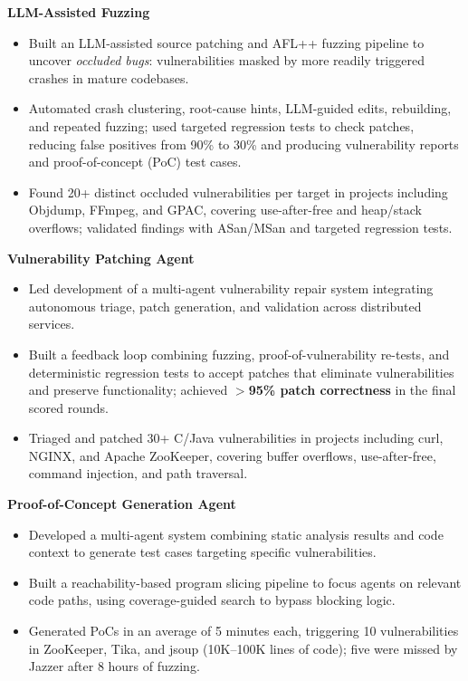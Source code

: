 \documentclass{resume}
\newcommand{\project}[1]{\par\addvspace{0.7ex}\Needspace{4\baselineskip}\textbf{#1}\par}
\begin{document}
\newpage
{}
\project{LLM-Assisted Fuzzing}
\begin{itemize}
\item Built an LLM-assisted source patching and AFL++ fuzzing pipeline to uncover \emph{occluded bugs}: vulnerabilities masked by more readily triggered crashes in mature codebases.
\item Automated crash clustering, root-cause hints, LLM-guided edits, rebuilding, and repeated fuzzing; used targeted regression tests to check patches, reducing false positives from 90\% to 30\% and producing vulnerability reports and proof-of-concept (PoC) test cases.
\item Found 20+ distinct occluded vulnerabilities per target in projects including Objdump, FFmpeg, and GPAC, covering use-after-free and heap/stack overflows; validated findings with ASan/MSan and targeted regression tests.
\end{itemize}

\project{Vulnerability Patching Agent}
\begin{itemize}
\item Led development of a multi-agent vulnerability repair system integrating autonomous triage, patch generation, and validation across distributed services.
\item Built a feedback loop combining fuzzing, proof-of-vulnerability re-tests, and deterministic regression tests to accept patches that eliminate vulnerabilities and preserve functionality; achieved \textbf{$>$95\% patch correctness} in the final scored rounds.
\item Triaged and patched 30+ C/Java vulnerabilities in projects including curl, NGINX, and Apache ZooKeeper, covering buffer overflows, use-after-free, command injection, and path traversal.
\end{itemize}
\project{Proof-of-Concept Generation Agent}
\begin{itemize}
\item Developed a multi-agent system combining static analysis results and code context to generate test cases targeting specific vulnerabilities.
\item Built a reachability-based program slicing pipeline to focus agents on relevant code paths, using coverage-guided search to bypass blocking logic.
\item Generated PoCs in an average of 5 minutes each, triggering 10 vulnerabilities in ZooKeeper, Tika, and jsoup (10K--100K lines of code); five were missed by Jazzer after 8 hours of fuzzing.
\end{itemize}
\end{document}
